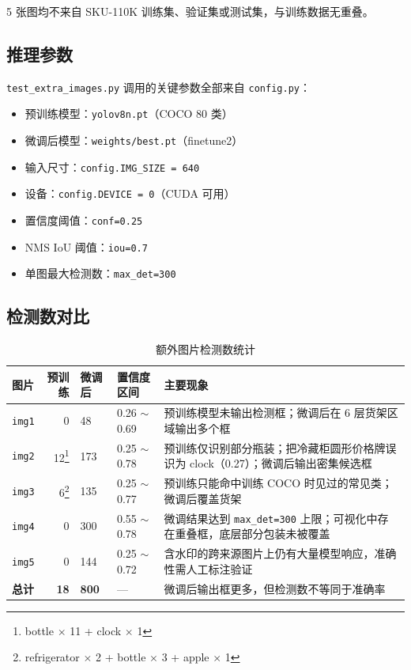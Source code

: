 \documentclass[12pt,a4paper]{ctexart}
\begin{document}
5 张图均不来自 SKU-110K 训练集、验证集或测试集，与训练数据无重叠。

\subsection{推理参数}

\texttt{test\_extra\_images.py} 调用的关键参数全部来自 \texttt{config.py}：

\begin{itemize}[itemsep=2pt]
    \item 预训练模型：\texttt{yolov8n.pt}（COCO 80 类）
    \item 微调后模型：\texttt{weights/best.pt}（finetune2）
    \item 输入尺寸：\texttt{config.IMG\_SIZE = 640}
    \item 设备：\texttt{config.DEVICE = 0}（CUDA 可用）
    \item 置信度阈值：\texttt{conf=0.25}
    \item NMS IoU 阈值：\texttt{iou=0.7}
    \item 单图最大检测数：\texttt{max\_det=300}
\end{itemize}

\subsection{检测数对比}

\begin{table}[H]
\centering
\caption{额外图片检测数统计}
\small
\begin{tabular}{p{1.5cm}rp{1.8cm}p{1.8cm}p{5cm}}
\toprule
\textbf{图片} & \textbf{预训练} & \textbf{微调后} & \textbf{置信度区间} & \textbf{主要现象} \\
\midrule
\texttt{img1} & 0 & 48 & 0.26 $\sim$ 0.69 & 预训练模型未输出检测框；微调后在 6 层货架区域输出多个框 \\
\texttt{img2} & 12\footnote{bottle $\times$ 11 + clock $\times$ 1} & 173 & 0.25 $\sim$ 0.78 & 预训练仅识别部分瓶装；把冷藏柜圆形价格牌误识为 clock（0.27）；微调后输出密集候选框 \\
\texttt{img3} & 6\footnote{refrigerator $\times$ 2 + bottle $\times$ 3 + apple $\times$ 1} & 135 & 0.25 $\sim$ 0.77 & 预训练只能命中训练 COCO 时见过的常见类；微调后覆盖货架 \\
\texttt{img4} & 0 & 300 & 0.55 $\sim$ 0.78 & 微调结果达到 \texttt{max\_det=300} 上限；可视化中存在重叠框，底层部分包装未被覆盖 \\
\texttt{img5} & 0 & 144 & 0.25 $\sim$ 0.72 & 含水印的跨来源图片上仍有大量模型响应，准确性需人工标注验证 \\
\midrule
\textbf{总计} & \textbf{18} & \textbf{800} & --- & 微调后输出框更多，但检测数不等同于准确率 \\
\bottomrule
\end{tabular}
\end{table}
\end{document}
